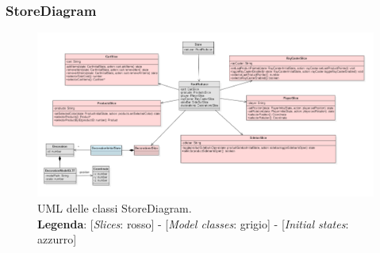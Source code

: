 \begin{landscape}
\thispagestyle{empty}
\subsubsection{StoreDiagram}
\begin{figure}[H]
	\centering
	\includegraphics[scale=0.7, keepaspectratio]{./res/images/storeDiagram.PNG}
	\caption[UML delle classi StoreDiagram]{
	UML delle classi StoreDiagram.
	\\
	\textbf{Legenda}: 
	[\textit{Slices}: rosso] -
	[\textit{Model classes}: grigio] -
	[\textit{Initial states}: azzurro]}
\end{figure}
\end{landscape}
\restoregeometry
